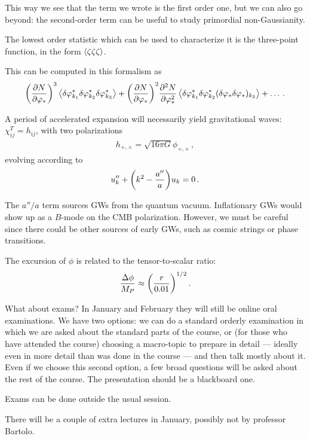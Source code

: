 \documentclass[main.tex]{subfiles}
\begin{document}
This way we see that the term we wrote is the first order one, but we can also go beyond: the second-order term can be useful to study primordial non-Gaussianity. 

The lowest order statistic which can be used to characterize it is the three-point function, in the form \(\expval{\zeta \zeta \zeta }\). 

This can be computed in this formalism as 
%
\begin{align}
\qty(\pdv{N}{\varphi _*})^3 \expval{ \delta \varphi _{k_1 }^{*}\delta \varphi _{k_2 }^{*}\delta \varphi _{k_3 }^{*}} 
+ 
\qty(\pdv{N}{\varphi _*})^2 \pdv[2]{N}{\varphi _*}
\expval{
    \delta \varphi ^*_{k_1 }
    \delta \varphi ^*_{k_2 }
    (\delta \varphi _* \delta \varphi _*)_{k_3 }
} + \dots
\,.
\end{align}

A period of accelerated expansion will necessarily yield gravitational waves: \(\chi_{ij}^{T} = h_{ij}\), with two polarizations 
%
\begin{align}
h_{+, \times} = \sqrt{16 \pi G } \phi_{+, \times }
\,,
\end{align}
%
evolving according to 
%
\begin{align}
u_k'' + \qty(k^2 - \frac{a''}{a}) u_k = 0
\,.
\end{align}

The \(a'' / a\) term sources GWs from the quantum vacuum. 
Inflationary GWs would show up as a \(B\)-mode on the CMB polarization. 
However, we must be careful since there could be other sources of early GWs, such as cosmic strings or phase transitions. 

The excursion of \(\phi \) is related to the tensor-to-scalar ratio: 
%
\begin{align}
\frac{\Delta \phi }{M_P} \approx \qty( \frac{r}{\num{.01}})^{1/2}
\,.
\end{align}

What about exams? In January and February they will still be online oral examinations.
We have two options: we can do a standard orderly examination in which we are asked about the standard parts of the course, or (for those who have attended the course) choosing a macro-topic to prepare in detail --- ideally even in more detail than was done in the course --- and then talk mostly about it. Even if we choose this second option, a few broad questions will be asked about the rest of the course. 
The presentation should be a blackboard one.

Exams can be done outside the usual session. 

There will be a couple of extra lectures in January, possibly not by professor Bartolo. 
\end{document}
